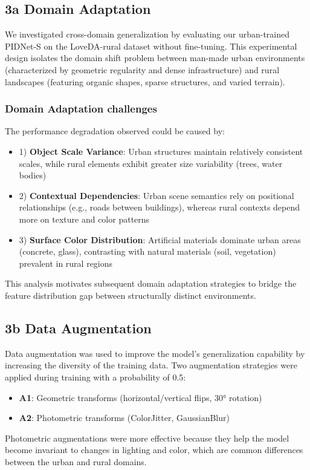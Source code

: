 \documentclass{article}
\begin{document}
\begin{multicols}{2}
\subsection{3a Domain Adaptation }
\label{subsec:domain_shift}
We investigated cross-domain generalization by evaluating our urban-trained PIDNet-S on the LoveDA-rural dataset without fine-tuning. This experimental design isolates the domain shift problem between man-made urban environments (characterized by geometric regularity and dense infrastructure) and rural landscapes (featuring organic shapes, sparse structures, and varied terrain).
\\
\subsubsection{Domain Adaptation challenges}
The performance degradation observed could be caused by:  
\begin{itemize}
\item1) \textbf{Object Scale Variance}: Urban structures maintain relatively consistent scales, while rural elements exhibit greater size variability (trees, water bodies)  
\item2) \textbf{Contextual Dependencies}: Urban scene semantics rely on positional relationships (e.g., roads between buildings), whereas rural contexts depend more on texture and color patterns  
\item3) \textbf{Surface Color Distribution}: Artificial materials dominate urban areas (concrete, glass), contrasting with natural materials (soil, vegetation) prevalent in rural regions
\end{itemize}
This analysis motivates subsequent domain adaptation strategies to bridge the feature distribution gap between structurally distinct environments.


		\subsection{3b Data Augmentation}
		Data augmentation was used to improve the model's generalization capability by increasing the diversity of the training data. Two augmentation strategies were applied during training with a probability of 0.5:
		\begin{itemize}
			\item \textbf{A1}: Geometric transforms (horizontal/vertical flips, 30° rotation)
			\item \textbf{A2}: Photometric transforms (ColorJitter, GaussianBlur)
		\end{itemize}
		Photometric augmentations were more effective because they help the model become invariant to changes in lighting and color, which are common differences between the urban and rural domains.
		

\end{multicols}
\end{document}
